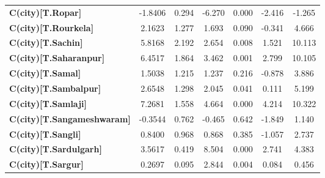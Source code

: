 \begin{center}
\begin{tabular}{lcccccc}
\textbf{C(city)[T.Ropar]}                                                                           &      -1.8406  &        0.294     &    -6.270  &         0.000        &       -2.416    &       -1.265     \\
\textbf{C(city)[T.Rourkela]}                                                                        &       2.1623  &        1.277     &     1.693  &         0.090        &       -0.341    &        4.666     \\
\textbf{C(city)[T.Sachin]}                                                                          &       5.8168  &        2.192     &     2.654  &         0.008        &        1.521    &       10.113     \\
\textbf{C(city)[T.Saharanpur]}                                                                      &       6.4517  &        1.864     &     3.462  &         0.001        &        2.799    &       10.105     \\
\textbf{C(city)[T.Samal]}                                                                           &       1.5038  &        1.215     &     1.237  &         0.216        &       -0.878    &        3.886     \\
\textbf{C(city)[T.Sambalpur]}                                                                       &       2.6548  &        1.298     &     2.045  &         0.041        &        0.111    &        5.199     \\
\textbf{C(city)[T.Samlaji]}                                                                         &       7.2681  &        1.558     &     4.664  &         0.000        &        4.214    &       10.322     \\
\textbf{C(city)[T.Sangameshwaram]}                                                                  &      -0.3544  &        0.762     &    -0.465  &         0.642        &       -1.849    &        1.140     \\
\textbf{C(city)[T.Sangli]}                                                                          &       0.8400  &        0.968     &     0.868  &         0.385        &       -1.057    &        2.737     \\
\textbf{C(city)[T.Sardulgarh]}                                                                      &       3.5617  &        0.419     &     8.504  &         0.000        &        2.741    &        4.383     \\
\textbf{C(city)[T.Sargur]}                                                                          &       0.2697  &        0.095     &     2.844  &         0.004        &        0.084    &        0.456     \\

\end{tabular}
\end{center}
